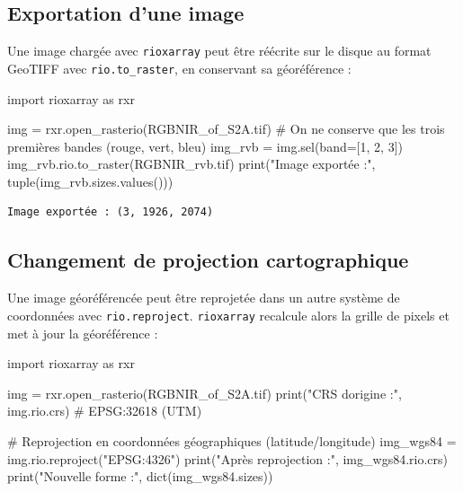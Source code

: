 \documentclass[
  french,
  11pt,
  letterpaper,
  open=any,
  twoside=false,
  french]{scrbook}
\newenvironment{Shaded}{\begin{snugshade}}{\end{snugshade}}
\newcommand{\BuiltInTok}[1]{\textcolor[rgb]{0.00,0.23,0.31}{#1}}
\newcommand{\CommentTok}[1]{\textcolor[rgb]{0.37,0.37,0.37}{#1}}
\newcommand{\DecValTok}[1]{\textcolor[rgb]{0.68,0.00,0.00}{#1}}
\newcommand{\ImportTok}[1]{\textcolor[rgb]{0.00,0.46,0.62}{#1}}
\newcommand{\NormalTok}[1]{\textcolor[rgb]{0.00,0.23,0.31}{#1}}
\newcommand{\OperatorTok}[1]{\textcolor[rgb]{0.37,0.37,0.37}{#1}}
\newcommand{\StringTok}[1]{\textcolor[rgb]{0.13,0.47,0.30}{#1}}
\begin{document}
\subsection{Exportation d'une image}\label{exportation-dune-image}

Une image chargée avec \texttt{rioxarray} peut être réécrite sur le
disque au format GeoTIFF avec \texttt{rio.to\_raster}, en conservant sa
géoréférence :

\begin{Shaded}
\begin{Highlighting}[]
\ImportTok{import}\NormalTok{ rioxarray }\ImportTok{as}\NormalTok{ rxr}

\NormalTok{img }\OperatorTok{=}\NormalTok{ rxr.open\_rasterio(}\StringTok{\textquotesingle{}RGBNIR\_of\_S2A.tif\textquotesingle{}}\NormalTok{)}
\CommentTok{\# On ne conserve que les trois premières bandes (rouge, vert, bleu)}
\NormalTok{img\_rvb }\OperatorTok{=}\NormalTok{ img.sel(band}\OperatorTok{=}\NormalTok{[}\DecValTok{1}\NormalTok{, }\DecValTok{2}\NormalTok{, }\DecValTok{3}\NormalTok{])}
\NormalTok{img\_rvb.rio.to\_raster(}\StringTok{\textquotesingle{}RGBNIR\_rvb.tif\textquotesingle{}}\NormalTok{)}
\BuiltInTok{print}\NormalTok{(}\StringTok{"Image exportée :"}\NormalTok{, }\BuiltInTok{tuple}\NormalTok{(img\_rvb.sizes.values()))}
\end{Highlighting}
\end{Shaded}

\begin{verbatim}
Image exportée : (3, 1926, 2074)
\end{verbatim}

\subsection{Changement de projection
cartographique}\label{changement-de-projection-cartographique}

Une image géoréférencée peut être reprojetée dans un autre système de
coordonnées avec \texttt{rio.reproject}. \texttt{rioxarray} recalcule
alors la grille de pixels et met à jour la géoréférence :

\begin{Shaded}
\begin{Highlighting}[]
\ImportTok{import}\NormalTok{ rioxarray }\ImportTok{as}\NormalTok{ rxr}

\NormalTok{img }\OperatorTok{=}\NormalTok{ rxr.open\_rasterio(}\StringTok{\textquotesingle{}RGBNIR\_of\_S2A.tif\textquotesingle{}}\NormalTok{)}
\BuiltInTok{print}\NormalTok{(}\StringTok{"CRS d\textquotesingle{}origine :"}\NormalTok{, img.rio.crs)              }\CommentTok{\# EPSG:32618 (UTM)}

\CommentTok{\# Reprojection en coordonnées géographiques (latitude/longitude)}
\NormalTok{img\_wgs84 }\OperatorTok{=}\NormalTok{ img.rio.reproject(}\StringTok{"EPSG:4326"}\NormalTok{)}
\BuiltInTok{print}\NormalTok{(}\StringTok{"Après reprojection :"}\NormalTok{, img\_wgs84.rio.crs)}
\BuiltInTok{print}\NormalTok{(}\StringTok{"Nouvelle forme :"}\NormalTok{, }\BuiltInTok{dict}\NormalTok{(img\_wgs84.sizes))}
\end{Highlighting}
\end{Shaded}
\end{document}
